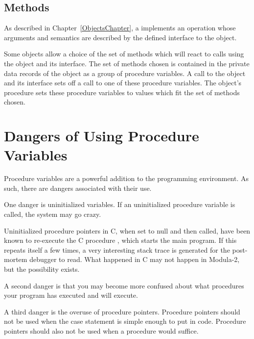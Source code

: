 \subsection{Methods}

As described in Chapter~\ref{ObjectsChapter}, a  implements an
operation whose arguments and semantics are described by the defined
interface to the object.

Some objects allow a choice of the set of methods which will react to calls
using
the object and its interface.  The set of methods chosen is
contained in the private data records of the object as a group of procedure 
variables.
A call to the object and its interface sets off a call
to one of these procedure variables.  The object's  procedure 
sets these procedure variables to values which fit the set of methods
chosen.

\section{Dangers of Using Procedure Variables}

Procedure variables are a powerful addition to the programming environment.
As such, there are dangers associated with their use.


One danger is uninitialized variables.  If an uninitialized procedure variable
is called, the system may go crazy.

Uninitialized procedure pointers in C, when set to null and then called, have
been known to re-execute the C procedure , which starts the main
program.  If this repeats itself a few times, a very interesting stack trace
is generated for the post-mortem debugger to read.
What happened in C may not happen in Modula-2, but the possibility exists.


A second danger is that you may become more confused about what procedures
your program has executed and will execute.

A third danger is the overuse of procedure pointers. 
Procedure pointers should not be used when the case statement is simple 
enough to put in code.  Procedure pointers should also not be used when 
a procedure
would suffice.


